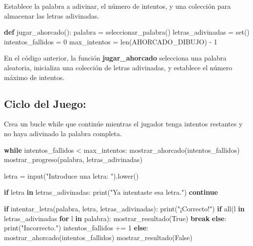 \documentclass[
  a4paper,
  DIV=11,
  numbers=noendperiod,
  onepage,
  openany]{scrreprt}
\newenvironment{Shaded}{\begin{snugshade}}{\end{snugshade}}
\newcommand{\BuiltInTok}[1]{\textcolor[rgb]{0.00,0.23,0.31}{#1}}
\newcommand{\ControlFlowTok}[1]{\textcolor[rgb]{0.00,0.23,0.31}{\textbf{#1}}}
\newcommand{\DecValTok}[1]{\textcolor[rgb]{0.68,0.00,0.00}{#1}}
\newcommand{\KeywordTok}[1]{\textcolor[rgb]{0.00,0.23,0.31}{\textbf{#1}}}
\newcommand{\NormalTok}[1]{\textcolor[rgb]{0.00,0.23,0.31}{#1}}
\newcommand{\OperatorTok}[1]{\textcolor[rgb]{0.37,0.37,0.37}{#1}}
\newcommand{\StringTok}[1]{\textcolor[rgb]{0.13,0.47,0.30}{#1}}
\newcommand{\VariableTok}[1]{\textcolor[rgb]{0.07,0.07,0.07}{#1}}
\begin{document}
Establece la palabra a adivinar, el número de intentos, y una colección
para almacenar las letras adivinadas.

\begin{Shaded}
\begin{Highlighting}[]
\KeywordTok{def}\NormalTok{ jugar\_ahorcado():}
\NormalTok{    palabra }\OperatorTok{=}\NormalTok{ seleccionar\_palabra()}
\NormalTok{    letras\_adivinadas }\OperatorTok{=} \BuiltInTok{set}\NormalTok{()}
\NormalTok{    intentos\_fallidos }\OperatorTok{=} \DecValTok{0}
\NormalTok{    max\_intentos }\OperatorTok{=} \BuiltInTok{len}\NormalTok{(AHORCADO\_DIBUJO) }\OperatorTok{{-}} \DecValTok{1}
\end{Highlighting}
\end{Shaded}

En el código anterior, la función \textbf{jugar\_ahorcado} selecciona
una palabra aleatoria, inicializa una colección de letras adivinadas, y
establece el número máximo de intentos.

\subsection{Ciclo del Juego:}\label{ciclo-del-juego}

Crea un bucle while que continúe mientras el jugador tenga intentos
restantes y no haya adivinado la palabra completa.

\begin{Shaded}
\begin{Highlighting}[]
    \ControlFlowTok{while}\NormalTok{ intentos\_fallidos }\OperatorTok{\textless{}}\NormalTok{ max\_intentos:}
\NormalTok{        mostrar\_ahorcado(intentos\_fallidos)}
\NormalTok{        mostrar\_progreso(palabra, letras\_adivinadas)}
        
\NormalTok{        letra }\OperatorTok{=} \BuiltInTok{input}\NormalTok{(}\StringTok{"Introduce una letra: "}\NormalTok{).lower()}
        
        \ControlFlowTok{if}\NormalTok{ letra }\KeywordTok{in}\NormalTok{ letras\_adivinadas:}
            \BuiltInTok{print}\NormalTok{(}\StringTok{"Ya intentaste esa letra."}\NormalTok{)}
            \ControlFlowTok{continue}
        
        \ControlFlowTok{if}\NormalTok{ intentar\_letra(palabra, letra, letras\_adivinadas):}
            \BuiltInTok{print}\NormalTok{(}\StringTok{"¡Correcto!"}\NormalTok{)}
            \ControlFlowTok{if} \BuiltInTok{all}\NormalTok{(l }\KeywordTok{in}\NormalTok{ letras\_adivinadas }\ControlFlowTok{for}\NormalTok{ l }\KeywordTok{in}\NormalTok{ palabra):}
\NormalTok{                mostrar\_resultado(}\VariableTok{True}\NormalTok{)}
                \ControlFlowTok{break}
        \ControlFlowTok{else}\NormalTok{:}
            \BuiltInTok{print}\NormalTok{(}\StringTok{"Incorrecto."}\NormalTok{)}
\NormalTok{            intentos\_fallidos }\OperatorTok{+=} \DecValTok{1}
    \ControlFlowTok{else}\NormalTok{:}
\NormalTok{        mostrar\_ahorcado(intentos\_fallidos)}
\NormalTok{        mostrar\_resultado(}\VariableTok{False}\NormalTok{)}
\end{Highlighting}
\end{Shaded}
\end{document}
